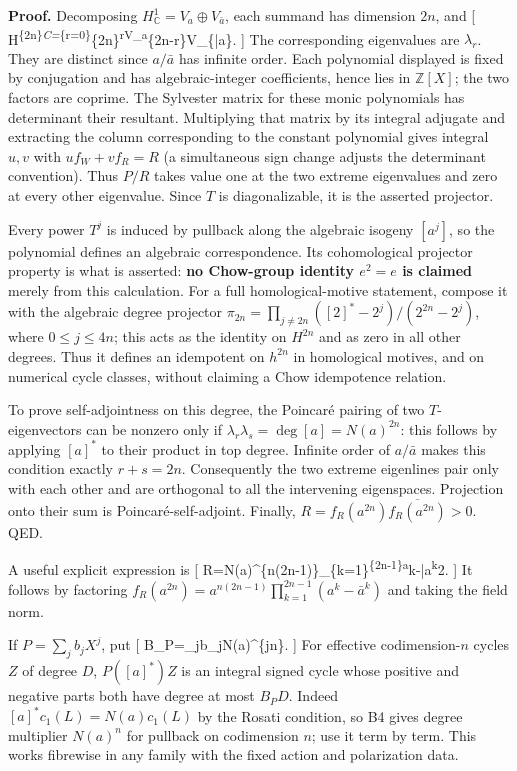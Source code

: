 \documentclass[11pt,a4paper]{article}
\theoremstyle{definition}
\begin{document}
\textbf{Proof.} Decomposing \(H^1_\mathbb C=V_a\oplus V_{\bar a}\), each
summand has dimension \(2n\), and {[}
H\textsuperscript{\{2n\}\emph{\mathbb C=\bigoplus}\{r=0\}}\{2n\}\bigwedge\textsuperscript{rV\_a\otimes\bigwedge}\{2n-r\}V\_\{\bar a\}.
{]} The corresponding eigenvalues are \(\lambda_r\). They are distinct
since \(a/\bar a\) has infinite order. Each polynomial displayed is
fixed by conjugation and has algebraic-integer coefficients, hence lies
in \(\mathbb Z[X]\); the two factors are coprime. The Sylvester matrix
for these monic polynomials has determinant their resultant. Multiplying
that matrix by its integral adjugate and extracting the column
corresponding to the constant polynomial gives integral \(u,v\) with
\(u f_W+v f_R=R\) (a simultaneous sign change adjusts the determinant
convention). Thus \(P/R\) takes value one at the two extreme eigenvalues
and zero at every other eigenvalue. Since \(T\) is diagonalizable, it is
the asserted projector.

Every power \(T^j\) is induced by pullback along the algebraic isogeny
\([a^j]\), so the polynomial defines an algebraic correspondence. Its
cohomological projector property is what is asserted: \textbf{no
Chow-group identity \(e^2=e\) is claimed} merely from this calculation.
For a full homological-motive statement, compose it with the algebraic
degree projector \(\pi_{2n}=\prod_{j\ne2n}([2]^*-2^j)/(2^{2n}-2^j)\),
where \(0\leq j\leq4n\); this acts as the identity on \(H^{2n}\) and as
zero in all other degrees. Thus it defines an idempotent on \(h^{2n}\)
in homological motives, and on numerical cycle classes, without claiming
a Chow idempotence relation.

To prove self-adjointness on this degree, the Poincaré pairing of two
\(T\)-eigenvectors can be nonzero only if
\(\lambda_r\lambda_s=\deg[a]=N(a)^{2n}\): this follows by applying
\([a]^*\) to their product in top degree. Infinite order of \(a/\bar a\)
makes this condition exactly \(r+s=2n\). Consequently the two extreme
eigenlines pair only with each other and are orthogonal to all the
intervening eigenspaces. Projection onto their sum is
Poincaré-self-adjoint. Finally,
\(R=f_R(a^{2n})\overline{f_R(a^{2n})}>0\). QED.

A useful explicit expression is {[}
R=N(a)\^{}\{n(2n-1)\}\prod\_\{k=1\}\textsuperscript{\{2n-1\}\textbar a}k-\bar a\textsuperscript{k\textbar{}}2.
{]} It follows by factoring
\(f_R(a^{2n})=a^{n(2n-1)}\prod_{k=1}^{2n-1}(a^k-\bar a^k)\) and taking
the field norm.

If \(P=\sum_jb_jX^j\), put {[}
B\_P=\sum\_j\textbar b\_j\textbar N(a)\^{}\{jn\}. {]} For effective
codimension-\(n\) cycles \(Z\) of degree \(D\), \(P([a]^*)Z\) is an
integral signed cycle whose positive and negative parts both have degree
at most \(B_PD\). Indeed \([a]^*c_1(L)=N(a)c_1(L)\) by the Rosati
condition, so B4 gives degree multiplier \(N(a)^n\) for pullback on
codimension \(n\); use it term by term. This works fibrewise in any
family with the fixed action and polarization data.
\end{document}
